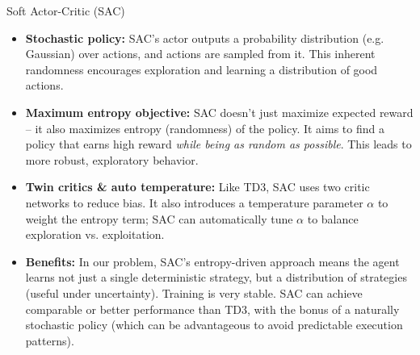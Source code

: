 \documentclass[11pt,aspectratio=169]{beamer}   %
\begin{document}
\begin{frame}{Soft Actor-Critic (SAC)}
	\begin{itemize}
		\item \textbf{Stochastic policy:} SAC’s actor outputs a probability distribution (e.g. Gaussian) over actions, and actions are sampled from it. This inherent randomness encourages exploration and learning a distribution of good actions.
		\item \textbf{Maximum entropy objective:} SAC doesn’t just maximize expected reward – it also maximizes entropy (randomness) of the policy. It aims to find a policy that earns high reward \emph{while being as random as possible}. This leads to more robust, exploratory behavior.
		\item \textbf{Twin critics \& auto temperature:} Like TD3, SAC uses two critic networks to reduce bias. It also introduces a temperature parameter $\alpha$ to weight the entropy term; SAC can automatically tune $\alpha$ to balance exploration vs. exploitation.
		\item \textbf{Benefits:} In our problem, SAC’s entropy-driven approach means the agent learns not just a single deterministic strategy, but a distribution of strategies (useful under uncertainty). Training is very stable. SAC can achieve comparable or better performance than TD3, with the bonus of a naturally stochastic policy (which can be advantageous to avoid predictable execution patterns).
	\end{itemize}
\end{frame}
\end{document}
